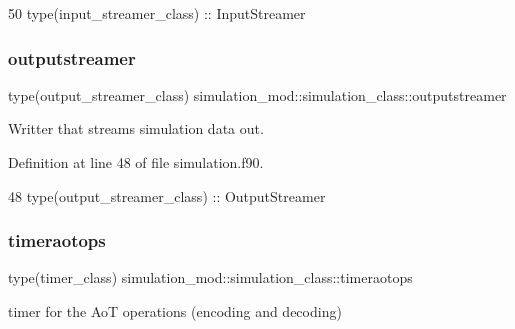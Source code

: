 \begin{DoxyCode}
50         \textcolor{keywordtype}{type}(input\_streamer\_class)  :: InputStreamer
\end{DoxyCode}
\mbox{\label{structsimulation__mod_1_1simulation__class_a75e838871eedd2fd66dc7d9bfce015ad}} 
\subsubsection{\texorpdfstring{outputstreamer}{outputstreamer}}
{\footnotesize\ttfamily type(output\+\_\+streamer\+\_\+class) simulation\+\_\+mod\+::simulation\+\_\+class\+::outputstreamer\hspace{0.3cm}{\ttfamily [private]}}



Writter that streams simulation data out. 



Definition at line 48 of file simulation.\+f90.


\begin{DoxyCode}
48         \textcolor{keywordtype}{type}(output\_streamer\_class) :: OutputStreamer
\end{DoxyCode}
\mbox{\label{structsimulation__mod_1_1simulation__class_a257e36d030e7226c67f04e871ab39a6b}} 
\subsubsection{\texorpdfstring{timeraotops}{timeraotops}}
{\footnotesize\ttfamily type(timer\+\_\+class) simulation\+\_\+mod\+::simulation\+\_\+class\+::timeraotops\hspace{0.3cm}{\ttfamily [private]}}



timer for the AoT operations (encoding and decoding) 




